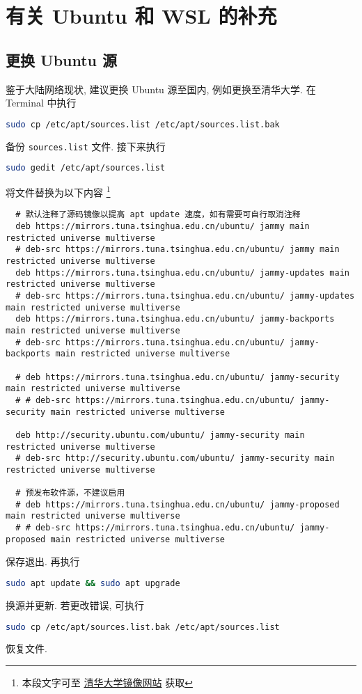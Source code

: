 
\chapter{有关 Ubuntu 和 WSL 的补充}\label{chp:appendix:addition}

\section{更换 Ubuntu 源}\label{sec:addition:source}

鉴于大陆网络现状,
建议更换 Ubuntu 源至国内,
例如更换至清华大学.
在 \textsf{Terminal} 中执行
\begin{lstlisting}[language = bash]
  sudo cp /etc/apt/sources.list /etc/apt/sources.list.bak
\end{lstlisting}
备份 \texttt{sources.list} 文件.
接下来执行
\begin{lstlisting}[language = bash]
  sudo gedit /etc/apt/sources.list
\end{lstlisting}
将文件替换为以下内容%
\footnote{本段文字可至%
  \href{https://mirrors.tuna.tsinghua.edu.cn/help/ubuntu/}{清华大学镜像网站}%
  获取}
\begin{lstlisting}
  # 默认注释了源码镜像以提高 apt update 速度，如有需要可自行取消注释
  deb https://mirrors.tuna.tsinghua.edu.cn/ubuntu/ jammy main restricted universe multiverse
  # deb-src https://mirrors.tuna.tsinghua.edu.cn/ubuntu/ jammy main restricted universe multiverse
  deb https://mirrors.tuna.tsinghua.edu.cn/ubuntu/ jammy-updates main restricted universe multiverse
  # deb-src https://mirrors.tuna.tsinghua.edu.cn/ubuntu/ jammy-updates main restricted universe multiverse
  deb https://mirrors.tuna.tsinghua.edu.cn/ubuntu/ jammy-backports main restricted universe multiverse
  # deb-src https://mirrors.tuna.tsinghua.edu.cn/ubuntu/ jammy-backports main restricted universe multiverse

  # deb https://mirrors.tuna.tsinghua.edu.cn/ubuntu/ jammy-security main restricted universe multiverse
  # # deb-src https://mirrors.tuna.tsinghua.edu.cn/ubuntu/ jammy-security main restricted universe multiverse

  deb http://security.ubuntu.com/ubuntu/ jammy-security main restricted universe multiverse
  # deb-src http://security.ubuntu.com/ubuntu/ jammy-security main restricted universe multiverse

  # 预发布软件源，不建议启用
  # deb https://mirrors.tuna.tsinghua.edu.cn/ubuntu/ jammy-proposed main restricted universe multiverse
  # # deb-src https://mirrors.tuna.tsinghua.edu.cn/ubuntu/ jammy-proposed main restricted universe multiverse
\end{lstlisting}
保存退出.
再执行
\begin{lstlisting}[language=bash]
  sudo apt update && sudo apt upgrade
\end{lstlisting}
换源并更新.
若更改错误,
可执行
\begin{lstlisting}[language=bash]
  sudo cp /etc/apt/sources.list.bak /etc/apt/sources.list
\end{lstlisting}
恢复文件.

